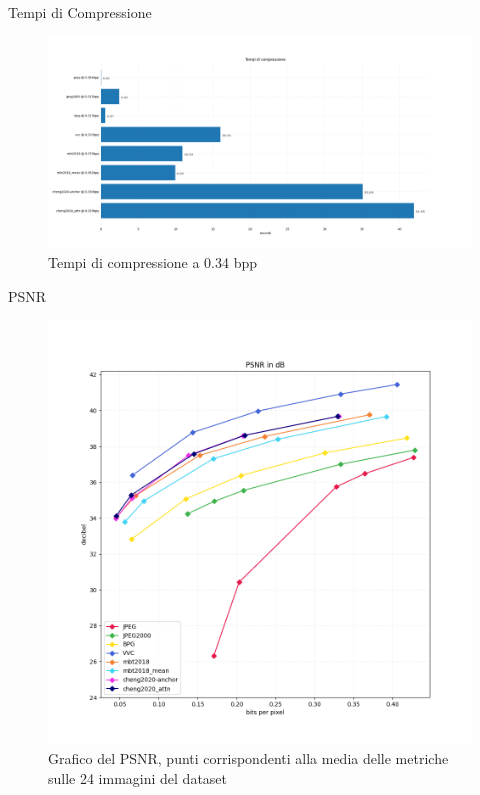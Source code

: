     \begin{frame}{Tempi di Compressione}
        \begin{figure}[t!]
            \centering
            \includegraphics[width=1\textwidth]{Immagini/METRICS/times@0.34bpp.png}
            \caption{Tempi di compressione a 0.34 bpp}
            \label{fig:times34}
        \end{figure}
    \end{frame}

    \begin{frame}{PSNR}
        \begin{figure}[t!]
            \centering
            \includegraphics[width=0.57\textheight]{Immagini/METRICS/PSNR.png}
            \caption{Grafico del PSNR, punti corrispondenti alla media delle metriche sulle 24 immagini del dataset}
            \label{fig:GraphPSNR}
        \end{figure}
    \end{frame}

